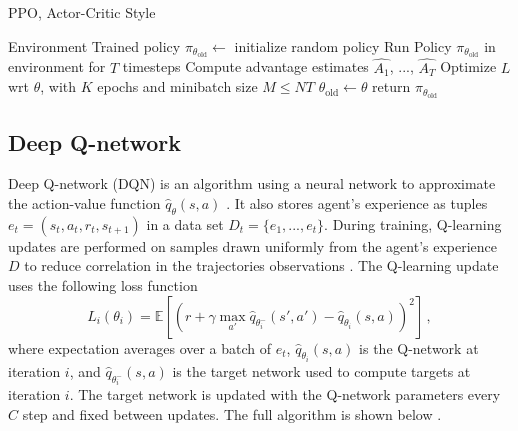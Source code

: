 \begin{algorithm}[H]
	\caption{PPO, Actor-Critic Style}\label{algorithm:ppo}
	\begin{algorithmic}[1]
	\renewcommand{\algorithmicrequire}{\hspace*{\algorithmicindent}  \textbf{Input:}}
	\renewcommand{\algorithmicensure}{\hspace*{\algorithmicindent}  \textbf{Output:}}
	\Require Environment
	\Ensure Trained policy 
	\State $\pi_{\theta_\text{old}} \gets$ initialize random policy
			\State Run Policy $\pi_{\theta_\text{old}}$ in environment for $T$ timesteps
			\State Compute advantage estimates $\hat{A_1}$, ..., $\hat{A_T}$
		\EndFor
		\State Optimize $L$ wrt $\theta$, with $K$ epochs and minibatch size $M \leq NT$
		\State $\theta_{\text{old}} \gets \theta$
	\EndFor
	\State return $\pi_{\theta_\text{old}}$
\end{algorithmic}
\end{algorithm}

\subsection{Deep Q-network} \label{dqn}

Deep Q-network (DQN) is an algorithm using a neural network to approximate the action-value function $\hat{q}_\theta(s, a)$ \cite{mnih2015human}. It also stores agent's experience as tuples $e_t = (s_t, a_t, r_t, s_{t+1})$ in a data set $D_t = \{e_1, ..., e_t\}$. During training, Q-learning updates are performed on samples drawn uniformly from the agent's experience $D$ to reduce correlation in the trajectories observations \cite{mnih2015human}. The Q-learning update uses the following loss function \cite{mnih2015human}
\begin{equation} \label{equation:2.16}
	L_i(\theta_i) = \mathbb{E} \left [\left ( r + \gamma \max_{a'}\hat{q}_{\theta^-_i}(s',a') -\hat{q}_{\theta_i}(s,a) \right )^2 \right ] \, ,
\end{equation}
where expectation averages over a batch of $e_t$,
$\hat{q}_{\theta_i}(s,a)$ is the Q-network at iteration $i$, and $\hat{q}_{\theta^-_i}(s,a)$ is the target network used to compute targets at iteration $i$. The target network is updated with the Q-network parameters every $C$ step and fixed between updates. The full algorithm is shown below \cite{mnih2015human}.


